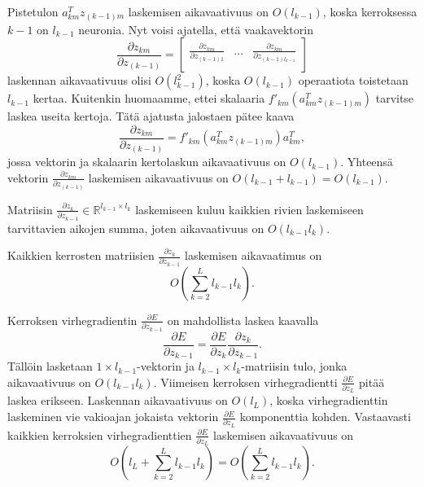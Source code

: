 \documentclass[11pt]{article}
\begin{document}
Pistetulon $a_{km}^Tz_{(k - 1)m}$ laskemisen aikavaativuus on $O(l_{k - 1})$, koska kerroksessa $k - 1$ on $l_{k - 1}$ neuronia. Nyt voisi ajatella, että vaakavektorin 
\begin{equation*}
\frac{\partial z_{km}}{\partial z_{(k - 1)}} =  \left[ \begin{matrix}
\frac{\partial z_{km}}{\partial z_{(k - 1)1}} & \hdots & \frac{\partial z_{km}}{\partial z_{(k - 1)l_{k - 1}}} \\
\end{matrix}  \right]
\end{equation*}
laskennan aikavaativuus olisi $O(l_{k - 1}^2)$, koska $O(l_{k - 1})$ operaatiota toistetaan $l_{k - 1}$ kertaa. Kuitenkin huomaamme, ettei skalaaria $f'_{km}(a_{km}^Tz_{(k - 1)m})$ tarvitse laskea useita kertoja. Tätä ajatusta jalostaen pätee kaava
\begin{equation*}
\frac{\partial z_{km}}{\partial z_{(k - 1)}} = f'_{km}(a_{km}^Tz_{(k - 1)m})a_{km}^T,
\end{equation*} 
jossa vektorin ja skalaarin kertolaskun aikavaativuus on $O(l_{k - 1})$. Yhteensä vektorin $\frac{\partial z_{km}}{\partial z_{(k - 1)}}$ laskemisen aikavaativuus on $O(l_{k - 1} + l_{k - 1}) = O(l_{k - 1})$.

Matriisin $\frac{\partial z_{k}}{\partial z_{k - 1}} \in  \mathbb{R}^{l_{k - 1} \times l_{k}}$ laskemiseen kuluu kaikkien rivien laskemiseen tarvittavien aikojen summa, joten aikavaativuus on $O(l_{k - 1} l_{k})$.

Kaikkien kerrosten matriisien $\frac{\partial z_{k}}{\partial z_{k - 1}}$ laskemisen aikavaatimus on
\begin{equation*}
O(\sum_{k = 2}^{L} l_{k - 1} l_{k}).
\end{equation*}

Kerroksen virhegradientin $\frac{\partial E}{\partial z_{k - 1}}$ on mahdollista laskea kaavalla 
\begin{equation*}
\frac{\partial E}{\partial z_{k - 1}} = \frac{\partial E}{\partial z_{k}} \frac{\partial z_{k}}{\partial z_{k - 1}}.
\end{equation*}
Tällöin lasketaan $1 \times l_{k - 1}$-vektorin ja $l_{k - 1} \times l_k$-matriisin tulo, jonka aikavaativuus on $O(l_{k - 1} l_k)$. Viimeisen kerroksen virhegradientti $\frac{\partial E}{\partial z_{L}}$ pitää laskea erikseen. Laskennan aikavaativuus on $O(l_L)$, koska virhegradienttin laskeminen vie vakioajan jokaista vektorin $\frac{\partial E}{\partial z_{L}}$ komponenttia kohden. Vastaavasti kaikkien kerroksien virhegradienttien $\frac{\partial E}{\partial z_{L}}$ laskemisen aikavaativuus on
\begin{equation*}
O(l_L + \sum_{k = 2}^{L} l_{k - 1} l_{k}) = O(\sum_{k = 2}^{L} l_{k - 1} l_{k}).
\end{equation*}
\end{document}
